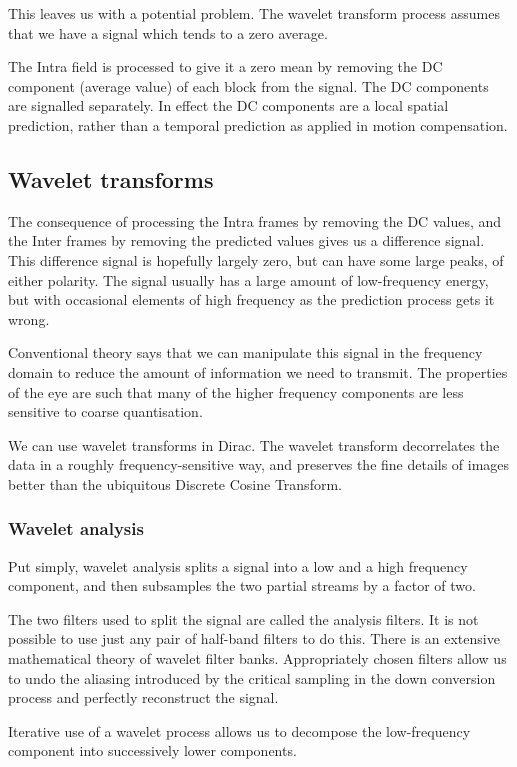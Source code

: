 This leaves us with a potential problem. The wavelet transform process
assumes that we have a signal which tends to a zero average.

The Intra field is processed to give it a zero mean by removing the DC
component (average value) of each block from the signal. The DC
components are signalled separately. In effect the DC components are a
local spatial prediction, rather than a temporal prediction as applied
in motion compensation.

\subsection{Wavelet transforms}
The consequence of processing the Intra frames by removing the DC
values, and the Inter frames by removing the predicted values gives us a
difference signal. This difference signal is hopefully largely zero, but
can have some large peaks, of either polarity. The signal usually has a
large amount of low-frequency energy, but with occasional elements of
high frequency as the prediction process gets it wrong.

Conventional theory says that we can manipulate this signal in the
frequency domain to reduce the amount of information we need to
transmit. The properties of the eye are such that many of the higher
frequency components are less sensitive to coarse quantisation.

We can use wavelet transforms in Dirac. The wavelet transform
decorrelates the data in a roughly frequency-sensitive way, and
preserves the fine details of images better than the ubiquitous Discrete
Cosine Transform.

\subsubsection{Wavelet analysis}

Put simply, wavelet analysis splits a signal into a low and a high
frequency component, and then subsamples the two partial streams by a
factor of two.

The two filters used to split the signal are called the analysis
filters. It is not possible to use just any pair of half-band filters to
do this. There is an extensive mathematical theory of wavelet filter
banks. Appropriately chosen filters allow us to undo the aliasing
introduced by the critical sampling in the down conversion process and
perfectly reconstruct the signal.

Iterative use of a wavelet process allows us to decompose the
low-frequency component into successively lower components.

